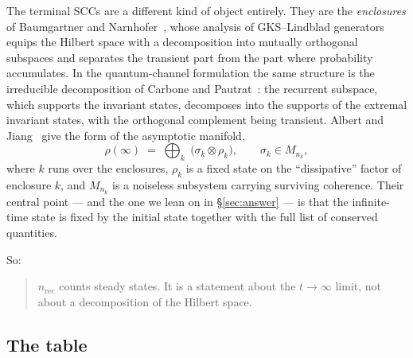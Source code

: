 \documentclass[11pt]{article}
\theoremstyle{plain}
\theoremstyle{definition}
\theoremstyle{remark}
\begin{document}
The terminal SCCs are a different kind of object entirely. They are the
\emph{enclosures} of Baumgartner and Narnhofer~\cite{bn2008}, whose analysis of
GKS--Lindblad generators equips the Hilbert space with a decomposition into
mutually orthogonal subspaces and separates the transient part from the
part where probability accumulates. In the quantum-channel formulation the
same structure is the irreducible decomposition of Carbone and
Pautrat~\cite{carbone2016}: the recurrent subspace, which supports the
invariant states, decomposes into the supports of the extremal invariant
states, with the orthogonal complement being transient. Albert and
Jiang~\cite{albert2014} give the form of the asymptotic manifold,
\begin{equation}
  \rho(\infty) \;=\; \bigoplus_k \;\big( \sigma_k \otimes \rho_k \big),
  \qquad \sigma_k \in M_{n_k},
  \label{eq:aj}
\end{equation}
where $k$ runs over the enclosures, $\rho_k$ is a fixed state on the
``dissipative'' factor of enclosure $k$, and $M_{n_k}$ is a noiseless
subsystem carrying surviving coherence. Their central point --- and the one we
lean on in \S\ref{sec:answer} --- is that the infinite-time state is fixed by
the initial state together with the full list of conserved quantities.

So:
\begin{quote}
$n_{\mathrm{rec}}$ counts steady states. It is a statement about the
$t \to \infty$ limit, not about a decomposition of the Hilbert space.
\end{quote}

\subsection{The table}
\end{document}
